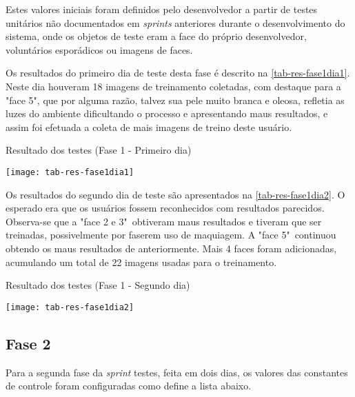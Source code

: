 Estes valores iniciais foram definidos pelo desenvolvedor a partir de testes unitários não documentados em \textit{sprints} anteriores durante o desenvolvimento do sistema, onde os objetos de teste eram a face do próprio desenvolvedor, voluntários esporádicos ou imagens de faces.

Os resultados do primeiro dia de teste desta fase é descrito na \autoref{tab-res-fase1dia1}. Neste dia houveram 18 imagens de treinamento coletadas, com destaque para a "face 5", que por alguma razão, talvez sua pele muito branca e oleosa, refletia as luzes do ambiente dificultando o processo e apresentando maus resultados, e assim foi efetuada a coleta de mais imagens de treino deste usuário.

\begin{table}[h]
	\centering
	\caption{Resultado dos testes (Fase 1 - Primeiro dia) }
	\texttt{[image: tab-res-fase1dia1]}
	\label{tab-res-fase1dia1}
\end{table}

Os resultados do segundo dia de teste são apresentados na \autoref{tab-res-fase1dia2}. O esperado era que os usuários fossem reconhecidos com resultados parecidos. Observa-se que a "face 2 e 3"\ obtiveram maus resultados e tiveram que ser treinadas, possivelmente por faserem uso de maquiagem. A "face 5"\ continuou obtendo os maus resultados de anteriormente. Mais 4 faces foram adicionadas, acumulando um total de 22 imagens usadas para o treinamento.

\begin{table}[h]
	\centering
	\caption{Resultado dos testes (Fase 1 - Segundo dia) }
	\texttt{[image: tab-res-fase1dia2]}
	\label{tab-res-fase1dia2}
\end{table}



\subsection{Fase 2}\label{ch:testresultfaz2}
Para a segunda fase da \textit{sprint} testes, feita em dois dias, os valores das constantes de controle foram configuradas como define a lista abaixo. 


